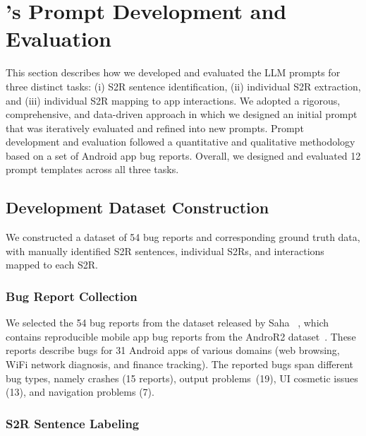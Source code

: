 
\section{\tool's Prompt Development and Evaluation}
\label{sec:prompt_development}

This section describes how we developed and evaluated the LLM prompts for three distinct tasks: (i) S2R sentence identification, (ii) individual S2R extraction, and (iii) individual S2R mapping to app interactions. 
We adopted a rigorous, comprehensive, and data-driven approach in which we designed an initial prompt that was iteratively evaluated and refined into new prompts. 
Prompt development and evaluation followed a quantitative and qualitative methodology based on a set of Android app bug reports. 
Overall, we designed and evaluated 12 prompt templates across all three tasks.

\subsection{Development Dataset Construction}
\label{sec:dev_dataset}

We constructed a dataset of 54 bug reports and corresponding ground truth data, with manually identified S2R sentences, individual S2Rs, and interactions mapped to each S2R.

\subsubsection{Bug Report Collection}

We selected the 54 bug reports from the dataset released by Saha \etal~\cite{saha2024toward}, which contains reproducible mobile app bug reports from the AndroR2 dataset~\cite{wendland2021,Johnson2022}. 
These reports describe bugs for 31 Android apps of various domains (\eg web browsing, WiFi network diagnosis, and finance tracking). 
The reported bugs span different bug types, namely crashes (15 reports), output problems~(19), UI cosmetic issues (13), and navigation problems (7). 

\subsubsection{S2R Sentence Labeling}
\label{sec:identification_data_dev}

